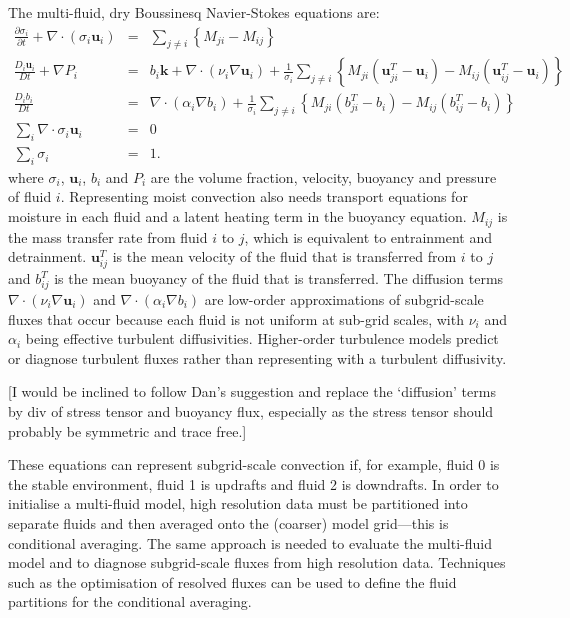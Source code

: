 \documentclass[11pt,a4paper]{article}
\begin{document}
The multi-fluid, dry Boussinesq Navier-Stokes equations \cite[approximated by][]{WMS20} are:
\begin{eqnarray}
\frac{\partial\sigma_{i}}{\partial t}+\nabla\cdot(\sigma_{i}\mathbf{u}_{i}) & = & {\textstyle\sum}_{j\ne i}\left\{ M_{ji}-M{}_{ij}\right\} \label{eq:sigma}\\
\frac{D_{i}\mathbf{u}_{i}}{Dt}+\nabla P_{i} & = & b_{i}\mathbf{k}+\nabla\cdot\left( \nu_i\nabla\mathbf{u}_{i}\right)+\frac{1}{\sigma_{i}}{\textstyle\sum}_{j\ne i}\left\{ M_{ji}\left(\mathbf{u}_{ji}^{T}-\mathbf{u}_{i}\right)-M_{ij}\left(\mathbf{u}_{ij}^{T}-\mathbf{u}_{i}\right)\right\} \label{eq:mom}\\
\frac{D_{i}b_{i}}{Dt} & = & \nabla\cdot \left(\alpha_i \nabla b_{i}\right)+\frac{1}{\sigma_{i}}{\textstyle\sum}_{j\ne i}\left\{ M_{ji}\left(b_{ji}^{T}-b_{i}\right)-M_{ij}\left(b_{ij}^{T}-b_{i}\right)\right\} \label{eq:b}\\
{\textstyle\sum}_{i}\nabla\cdot\sigma_{i}\mathbf{u}_{i} & = & 0\label{eq:divFree}\\
{\textstyle\sum}_{i}\sigma_{i} & = & 1.\label{eq:sumOne}
\end{eqnarray}
where $\sigma_i$, $\mathbf{u}_i$, $b_i$ and $P_i$ are the volume fraction, velocity, buoyancy and pressure of fluid $i$. Representing moist convection also needs transport equations for moisture in each fluid and a latent heating term in the buoyancy equation. $M_{ij}$ is the mass transfer rate from fluid $i$ to $j$, which is equivalent to entrainment and detrainment. $\mathbf{u}_{ij}^T$ is the mean velocity of the fluid that is transferred from $i$ to $j$ and $b_{ij}^T$ is the mean buoyancy of the fluid that is transferred. The diffusion terms $\nabla\cdot\left( \nu_i\nabla\mathbf{u}_{i}\right)$ and $\nabla\cdot \left(\alpha_i \nabla b_{i}\right)$ are low-order approximations of subgrid-scale fluxes that occur because each fluid is not uniform at sub-grid scales, with $\nu_i$ and $\alpha_i$ being effective turbulent diffusivities. Higher-order turbulence models predict or diagnose turbulent fluxes rather than representing with a turbulent diffusivity.

{\color{red}
[I would be inclined to follow Dan's suggestion and replace the `diffusion' terms by div of stress tensor and buoyancy flux, especially as the stress tensor should probably be symmetric and trace free.]}

These equations can represent subgrid-scale convection if, for example, fluid 0 is the stable environment, fluid 1 is updrafts and fluid 2 is downdrafts. In order to initialise a multi-fluid model, high resolution data must be partitioned into separate fluids and then averaged onto the (coarser) model grid---this is conditional averaging. The same approach is needed to evaluate the multi-fluid model and to diagnose subgrid-scale fluxes from high resolution data. Techniques such as the optimisation of resolved fluxes \cite[]{ETB20} can be used to define the fluid partitions for the conditional averaging.
\end{document}
